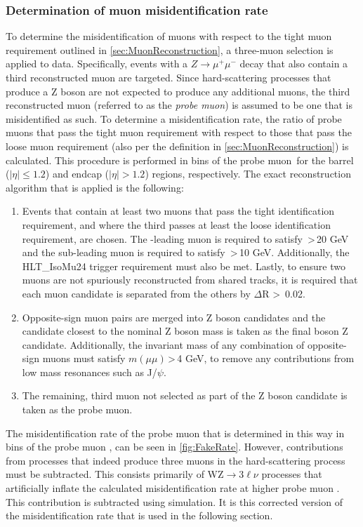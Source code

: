 \subsubsection{Determination of muon misidentification rate}
To determine the misidentification of muons with respect to the tight muon requirement outlined in \autoref{sec:MuonReconstruction}, a three-muon selection is applied to data. Specifically, events with a $Z\rightarrow\mu^+\mu^-$ decay that also contain a third reconstructed muon are targeted. Since hard-scattering processes that produce a Z boson are not expected to produce any additional muons, the third reconstructed muon (referred to as the \textit{probe muon}) is assumed to be one that is misidentified as such. To determine a misidentification rate, the ratio of probe muons that pass the tight muon requirement with respect to those that pass the loose muon requirement (also per the definition in \autoref{sec:MuonReconstruction}) is calculated. This procedure is performed in bins of the probe muon \pt \,for the barrel ($\lvert \eta \rvert \leq 1.2$) and endcap ($\lvert \eta \rvert > 1.2$) regions, respectively. The exact reconstruction algorithm that is applied is the following:
\begin{enumerate}
    \item Events that contain at least two muons that pass the tight identification requirement, and where the third passes at least the loose identification requirement, are chosen. The \pt-leading muon is required to satisfy \pt \,\textgreater \,20 GeV and the sub-leading muon is required to satisfy \pt \,\textgreater\,10 GeV. Additionally, the HLT\_IsoMu24 trigger requirement must also be met. Lastly, to ensure two muons are not spuriously reconstructed from shared tracks, it is required that each muon candidate is separated from the others by $\Delta$R \textgreater\, 0.02.
    \item Opposite-sign muon pairs are merged into Z boson candidates and the candidate closest to the nominal Z boson mass is taken as the final boson Z candidate. Additionally, the invariant mass of any combination of opposite-sign muons must satisfy $m(\mu\mu)$\,\textgreater\,4 GeV, to remove any contributions from low mass resonances such as J/$\psi$. 
    \item The remaining, third muon not selected as part of the Z boson candidate is taken as the probe muon.
\end{enumerate}
The misidentification rate of the probe muon that is determined in this way in bins of the probe muon \pt, can be seen in \autoref{fig:FakeRate}. However, contributions from processes that indeed produce three muons in the hard-scattering process must be subtracted. This consists primarily of WZ$\rightarrow3\ell\nu$ processes that artificially inflate the calculated misidentification rate at higher probe muon \pt \cite{StefThesis}. This contribution is subtracted using simulation. It is this corrected version of the misidentification rate that is used in the following section. 

